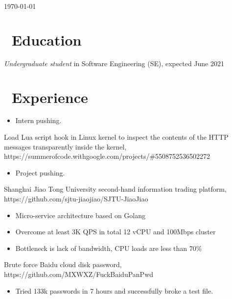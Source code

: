 \documentclass{resume}
\begin{document}
\today



\section{\faGraduationCap\ Education}
\textit{Undergraduate student} in Software Engineering (SE), expected June 2021

\section{\faUsers\ Experience}
\begin{itemize}
    \item Intern pushing.
\end{itemize}

Load Lua script hook in Linux kernel to inspect the contents of the HTTP messages transparently inside the kernel, https://summerofcode.withgoogle.com/projects/\#5508752536502272
\begin{itemize}
    \item Project pushing.
\end{itemize}

Shanghai Jiao Tong University second-hand information trading platform, https://github.com/sjtu-jiaojiao/SJTU-JiaoJiao
\begin{itemize}
    \item Micro-service architecture based on Golang
    \item Overcome at least 3K QPS in total 12 vCPU and 100Mbps cluster
    \item Bottleneck is lack of bandwidth, CPU loads are less than 70\%
\end{itemize}

Brute force Baidu cloud disk password, https://github.com/MXWXZ/FuckBaiduPanPwd
\begin{itemize}
    \item Tried 133k passwords in 7 hours and successfully broke a test file.
\end{itemize}
\end{document}
